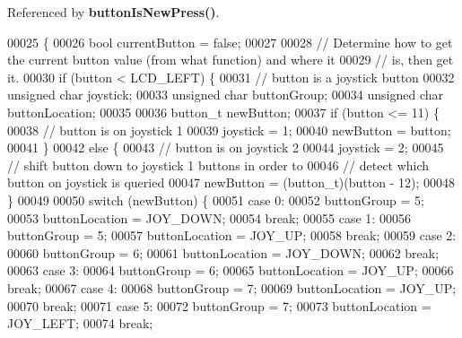Referenced by \textbf{ button\+Is\+New\+Press()}.


\begin{DoxyCode}
00025                                      \{
00026     \textcolor{keywordtype}{bool} currentButton = \textcolor{keyword}{false};
00027 
00028     \textcolor{comment}{// Determine how to get the current button value (from what function) and where it}
00029     \textcolor{comment}{// is, then get it.}
00030     \textcolor{keywordflow}{if} (button < LCD_LEFT) \{
00031         \textcolor{comment}{// button is a joystick button}
00032         \textcolor{keywordtype}{unsigned} \textcolor{keywordtype}{char} joystick;
00033         \textcolor{keywordtype}{unsigned} \textcolor{keywordtype}{char} buttonGroup;
00034         \textcolor{keywordtype}{unsigned} \textcolor{keywordtype}{char} buttonLocation;
00035 
00036         button_t newButton;
00037         \textcolor{keywordflow}{if} (button <= 11) \{
00038             \textcolor{comment}{// button is on joystick 1}
00039             joystick = 1;
00040             newButton = button;
00041         \}
00042         \textcolor{keywordflow}{else} \{
00043             \textcolor{comment}{// button is on joystick 2}
00044             joystick = 2;
00045             \textcolor{comment}{// shift button down to joystick 1 buttons in order to}
00046             \textcolor{comment}{// detect which button on joystick is queried}
00047             newButton = (button_t)(button - 12);
00048         \}
00049 
00050         \textcolor{keywordflow}{switch} (newButton) \{
00051         \textcolor{keywordflow}{case} 0:
00052             buttonGroup = 5;
00053             buttonLocation = JOY_DOWN;
00054             \textcolor{keywordflow}{break};
00055         \textcolor{keywordflow}{case} 1:
00056             buttonGroup = 5;
00057             buttonLocation = JOY_UP;
00058             \textcolor{keywordflow}{break};
00059         \textcolor{keywordflow}{case} 2:
00060             buttonGroup = 6;
00061             buttonLocation = JOY_DOWN;
00062             \textcolor{keywordflow}{break};
00063         \textcolor{keywordflow}{case} 3:
00064             buttonGroup = 6;
00065             buttonLocation = JOY_UP;
00066             \textcolor{keywordflow}{break};
00067         \textcolor{keywordflow}{case} 4:
00068             buttonGroup = 7;
00069             buttonLocation = JOY_UP;
00070             \textcolor{keywordflow}{break};
00071         \textcolor{keywordflow}{case} 5:
00072             buttonGroup = 7;
00073             buttonLocation = JOY_LEFT;
00074             \textcolor{keywordflow}{break};

\end{DoxyCode}
